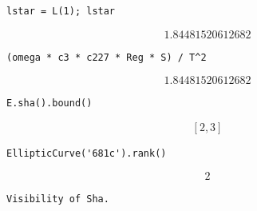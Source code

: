 \documentclass{book}
\begin{document}
\begin{lstlisting}
lstar = L(1); lstar
\end{lstlisting}$$1.84481520612682$$
\begin{lstlisting}
(omega * c3 * c227 * Reg * S) / T^2
\end{lstlisting}$$1.84481520612682$$
\begin{lstlisting}
E.sha().bound()
\end{lstlisting}$$\left[2, 3\right]$$
\begin{lstlisting}
EllipticCurve('681c').rank()
\end{lstlisting}$$2$$
\begin{lstlisting}
Visibility of Sha.
\end{lstlisting}






\end{document}
